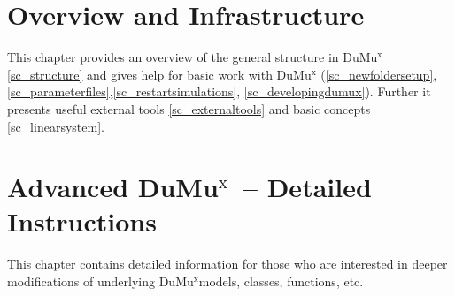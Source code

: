 \documentclass[11pt,a4paper,headinclude,footinclude,DIV16]{scrreprt}
\newcommand{\Dumux}{\texorpdfstring{Du\-Mu$^\text{x}$\xspace}{DuMuX\xspace}}
\begin{document}
\chapter{Overview and Infrastructure}
This chapter provides an overview of the general structure in \Dumux \ref{sc_structure}
and gives help for basic work with \Dumux
(\ref{sc_newfoldersetup},\ref{sc_parameterfiles},\ref{sc_restartsimulations}, \ref{sc_developingdumux}).
Further it presents useful external tools \ref{sc_externaltools} and basic
concepts \ref{sc_linearsystem}.








\chapter{Advanced \Dumux\ -- Detailed Instructions}
This chapter contains detailed information for those who are interested
in deeper modifications of underlying \Dumux models, classes, functions, etc.










\end{document}
